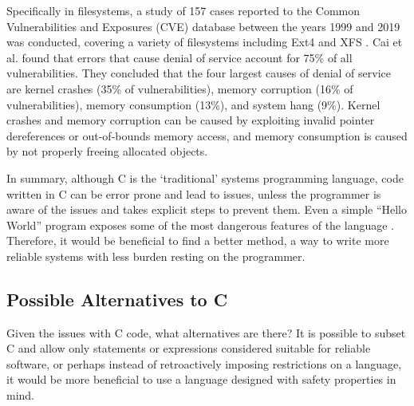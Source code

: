 Specifically in filesystems, a study of 157 cases reported to the Common Vulnerabilities and Exposures (CVE) database between the years 1999 and 2019 was conducted, covering a variety of filesystems including Ext4 and XFS \cite{cai2019}.
Cai et al. found that errors that cause denial of service account for 75\% of all vulnerabilities.
They concluded that the four largest causes of denial of service are kernel crashes (35\% of vulnerabilities), memory corruption (16\% of vulnerabilities), memory consumption (13\%), and system hang (9\%).
Kernel crashes and memory corruption can be caused by exploiting invalid pointer dereferences or out-of-bounds memory access, and memory consumption is caused by not properly freeing allocated objects.

In summary, although C is the `traditional' systems programming language, code written in C can be error prone and lead to issues, unless the programmer is aware of the issues and takes explicit steps to prevent them.
Even a simple ``Hello World'' program exposes some of the most dangerous features of the language \cite{milewski}.
Therefore, it would be beneficial to find a better method, a way to write more reliable systems with less burden resting on the programmer.

\subsection{Possible Alternatives to C}
Given the issues with C code, what alternatives are there?
It is possible to subset C and allow only statements or expressions considered suitable for reliable software, or perhaps instead of retroactively imposing restrictions on a language, it would be more beneficial to use a language designed with safety properties in mind.

